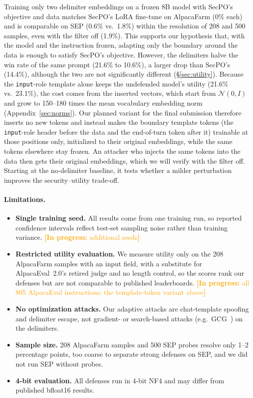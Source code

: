 \documentclass{article}
\newcommand{\inprogress}[1]{\textcolor{orange}{\textbf{[In progress:} #1\textbf{]}}}
\begin{document}
Training only two delimiter embeddings on a frozen 8B model with SecPO's objective and data matches SecPO's LoRA fine-tune on AlpacaFarm (0\% each) and is comparable on SEP (0.6\% vs.\ 1.8\%) within the resolution of 208 and 500 samples, even with the filter off (1.9\%). This supports our hypothesis that, with the model and the instruction frozen, adapting only the boundary around the data is enough to satisfy SecPO's objective. However, the delimiters halve the win rate of the same prompt (21.6\% to 10.6\%), a larger drop than SecPO's (14.4\%), although the two are not significantly different (\S\ref{sec:utility}). Because the \texttt{input}-role template alone keeps the undefended model's utility (21.6\% vs.\ 23.1\%), the cost comes from the inserted vectors, which start from $\mathcal{N}(0, I)$ and grow to 150--180 times the mean vocabulary embedding norm (Appendix~\ref{sec:norms}). Our planned variant for the final submission therefore inserts no new tokens and instead makes the boundary template tokens (the \texttt{input}-role header before the data and the end-of-turn token after it) trainable at those positions only, initialized to their original embeddings, while the same tokens elsewhere stay frozen. An attacker who injects the same tokens into the data then gets their original embeddings, which we will verify with the filter off. Starting at the no-delimiter baseline, it tests whether a milder perturbation improves the security--utility trade-off.

\paragraph{Limitations.}
\begin{itemize}\setlength{\itemsep}{0pt}
  \item \textbf{Single training seed.} All results come from one training run, so reported confidence intervals reflect test-set sampling noise rather than training variance. \inprogress{additional seeds}
  \item \textbf{Restricted utility evaluation.} We measure utility only on the 208 AlpacaFarm samples with an input field, with a substitute for AlpacaEval~2.0's retired judge and no length control, so the scores rank our defenses but are not comparable to published leaderboards. \inprogress{all 805 AlpacaEval instructions; the template-token variant above}
  \item \textbf{No optimization attacks.} Our adaptive attacks are chat-template spoofing and delimiter escape, not gradient- or search-based attacks (e.g.\ GCG~\cite{zou2023gcg}) on the delimiters.
  \item \textbf{Sample size.} 208 AlpacaFarm samples and 500 SEP probes resolve only 1--2 percentage points, too coarse to separate strong defenses on SEP, and we did not run SEP without probes.
  \item \textbf{4-bit evaluation.} All defenses run in 4-bit NF4 and may differ from published bfloat16 results.
\end{itemize}
\end{document}
